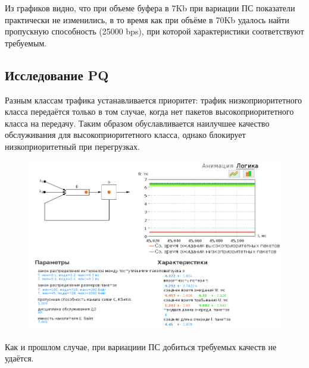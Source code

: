 \documentclass[12pt, a4paper] {ncc}
\begin{document}
		\newpage
		Из графиков видно, что при объеме буфера в 7Kb при вариации ПС показатели практически не изменились, в то
		время как при объёме в 70Kb удалось найти пропускную способность (25000 bps), при которой характеристики
		соответствуют требуемым.

	\subsection*{Исследование PQ}
        Разным классам трафика устанавливается приоритет: трафик низкоприоритетного класса передаётся только в том случае,
        когда нет пакетов высокоприоритетного класса на передачу. Таким образом обуславливается наилучшее качество обслуживания
        для высокоприоритетного класса, однако блокирует низкоприоритетный при перегрузках.

		\begin{figure}[h!]
			\includegraphics[scale=0.5]{./img/pq_5000_7000.png}
		\end{figure}
		\newpage
		Как и прошлом случае, при вариациии ПС добиться требуемых качеств не удаётся. 
\end{document}
